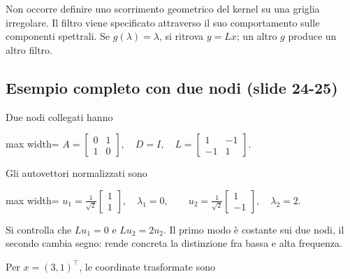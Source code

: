\documentclass[11pt,a4paper,oneside,openany]{book}
\begin{document}
Non occorre definire uno scorrimento geometrico del kernel su una griglia irregolare. Il filtro viene specificato attraverso il suo comportamento sulle componenti spettrali. Se \(g(\lambda)=\lambda\), si ritrova \(y=Lx\); un altro \(g\) produce un altro filtro.

\subsection{Esempio completo con due nodi (slide 24-25)}\label{f05-r373}

Due nodi collegati hanno

\begin{center}
\begin{adjustbox}{max width=\linewidth}
$\displaystyle A=\begin{bmatrix}0&1\\1&0\end{bmatrix},\quad D=I,\quad
L=\begin{bmatrix}1&-1\\-1&1\end{bmatrix}.$
\end{adjustbox}
\end{center}

Gli autovettori normalizzati sono

\begin{center}
\begin{adjustbox}{max width=\linewidth}
$\displaystyle u_1=\frac1{\sqrt2}\begin{bmatrix}1\\1\end{bmatrix},\quad \lambda_1=0,\qquad
u_2=\frac1{\sqrt2}\begin{bmatrix}1\\-1\end{bmatrix},\quad \lambda_2=2.$
\end{adjustbox}
\end{center}

Si controlla che \(Lu_1=0\) e \(Lu_2=2u_2\). Il primo modo è costante sui due nodi, il secondo cambia segno: rende concreta la distinzione fra bassa e alta frequenza.

Per \(x=(3,1)^\top\), le coordinate trasformate sono
\end{document}
